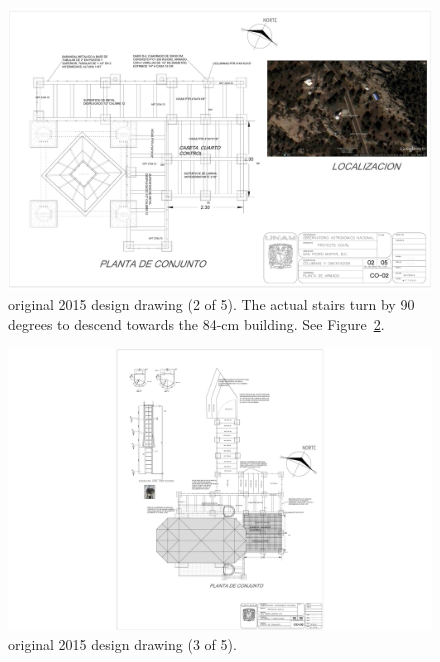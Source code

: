 \begin{figure}
\begin{center}
\includegraphics[height=0.95\linewidth,angle=90]{figures/buildings-coatli-drawing-2015-2.pdf}
\end{center}
\caption{{\projectname} original 2015 design drawing (2 of 5). The actual stairs turn by 90 degrees to descend towards the 84-cm building. See Figure~\ref{figure:buildings-drawing-2015-3}.}
\label{figure:buildings-drawing-2015-2}
\end{figure}

\begin{figure}
\begin{center}
\includegraphics[width=0.95\linewidth]{figures/buildings-coatli-drawing-2015-3.pdf}
\end{center}
\caption{{\projectname} original 2015 design drawing (3 of 5).}
\label{figure:buildings-drawing-2015-3}
\end{figure}

